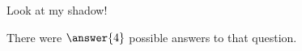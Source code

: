 \documentclass{ximera}
\begin{document}
\begin{theorem}
Look at my shadow!
\end{theorem}

\begin{problem}
  \begin{multipleChoice}
  \end{multipleChoice}

  \begin{problem}
    There were $\answer{4}$ possible answers to that question.

    \begin{problem}
      \begin{multipleChoice}
      \end{multipleChoice}
    \end{problem}
  \end{problem}
\end{problem}
\end{document}
